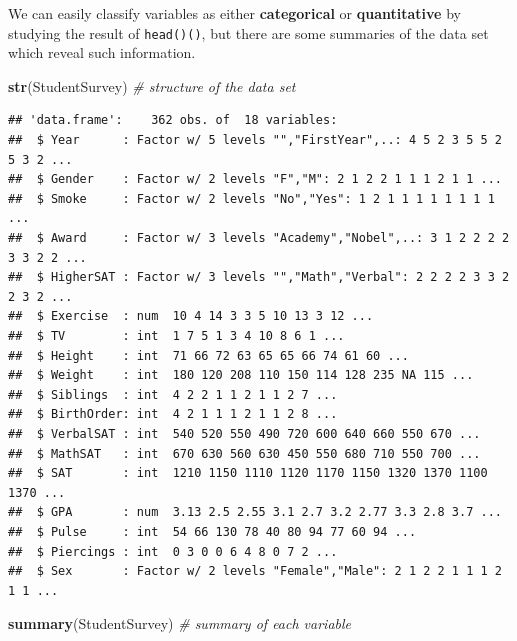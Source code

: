 \documentclass[]{book}
\newenvironment{Shaded}{\begin{snugshade}}{\end{snugshade}}
\newcommand{\CommentTok}[1]{\textcolor[rgb]{0.56,0.35,0.01}{\textit{#1}}}
\newcommand{\KeywordTok}[1]{\textcolor[rgb]{0.13,0.29,0.53}{\textbf{#1}}}
\newcommand{\NormalTok}[1]{#1}
\begin{document}
We can easily classify variables as either \textbf{categorical} or \textbf{quantitative} by studying the result of \texttt{head()()}, but there are some summaries of the data set which reveal such information.

\begin{Shaded}
\begin{Highlighting}[]
\KeywordTok{str}\NormalTok{(StudentSurvey)     }\CommentTok{# structure of the data set}
\end{Highlighting}
\end{Shaded}

\begin{verbatim}
## 'data.frame':    362 obs. of  18 variables:
##  $ Year      : Factor w/ 5 levels "","FirstYear",..: 4 5 2 3 5 5 2 5 3 2 ...
##  $ Gender    : Factor w/ 2 levels "F","M": 2 1 2 2 1 1 1 2 1 1 ...
##  $ Smoke     : Factor w/ 2 levels "No","Yes": 1 2 1 1 1 1 1 1 1 1 ...
##  $ Award     : Factor w/ 3 levels "Academy","Nobel",..: 3 1 2 2 2 2 3 3 2 2 ...
##  $ HigherSAT : Factor w/ 3 levels "","Math","Verbal": 2 2 2 2 3 3 2 2 3 2 ...
##  $ Exercise  : num  10 4 14 3 3 5 10 13 3 12 ...
##  $ TV        : int  1 7 5 1 3 4 10 8 6 1 ...
##  $ Height    : int  71 66 72 63 65 65 66 74 61 60 ...
##  $ Weight    : int  180 120 208 110 150 114 128 235 NA 115 ...
##  $ Siblings  : int  4 2 2 1 1 2 1 1 2 7 ...
##  $ BirthOrder: int  4 2 1 1 1 2 1 1 2 8 ...
##  $ VerbalSAT : int  540 520 550 490 720 600 640 660 550 670 ...
##  $ MathSAT   : int  670 630 560 630 450 550 680 710 550 700 ...
##  $ SAT       : int  1210 1150 1110 1120 1170 1150 1320 1370 1100 1370 ...
##  $ GPA       : num  3.13 2.5 2.55 3.1 2.7 3.2 2.77 3.3 2.8 3.7 ...
##  $ Pulse     : int  54 66 130 78 40 80 94 77 60 94 ...
##  $ Piercings : int  0 3 0 0 6 4 8 0 7 2 ...
##  $ Sex       : Factor w/ 2 levels "Female","Male": 2 1 2 2 1 1 1 2 1 1 ...
\end{verbatim}

\begin{Shaded}
\begin{Highlighting}[]
\KeywordTok{summary}\NormalTok{(StudentSurvey) }\CommentTok{# summary of each variable}
\end{Highlighting}
\end{Shaded}
\end{document}

